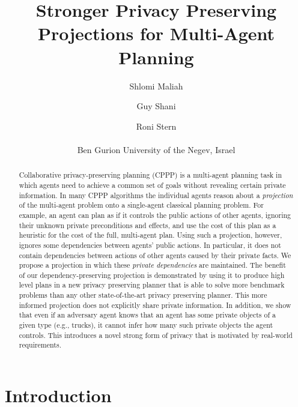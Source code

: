 \documentclass[letterpaper]{article}
\theoremstyle{definition}
\begin{document}
%
\title{Stronger Privacy Preserving Projections for Multi-Agent Planning}
\author{Shlomi Maliah \and Guy Shani \and Roni Stern\\\\
Ben Gurion University of the Negev, Israel\\
}
\maketitle
\begin{abstract}
Collaborative privacy-preserving planning (CPPP) is a multi-agent planning task in which agents need to achieve a common set of goals without revealing certain private information. In many CPPP algorithms the individual agents reason about a {\em projection} of the multi-agent problem onto a single-agent classical planning problem.
For example, an agent can plan as if it controls the public actions of other agents, ignoring their unknown private preconditions and effects, and use the cost of this plan as a heuristic for the cost of the full, multi-agent plan. Using such a projection, however, ignores some dependencies between agents' public actions. In particular, it does not contain dependencies between actions  of other agents caused by their private facts. We propose a projection in which these {\em private dependencies} are maintained.
The benefit of our dependency-preserving projection is demonstrated by using it to produce high level plans in a new privacy preserving planner that is able to solve more benchmark problems than any other state-of-the-art privacy preserving planner.
This more informed projection does not explicitly share private information. In addition, we show that even if an adversary agent knows that an agent has some private objects of a given type (e.g., trucks), it cannot infer how many such private objects the agent controls. This introduces a novel strong form of privacy that is motivated by real-world requirements.
\end{abstract}
\section{Introduction}


\end{document}
